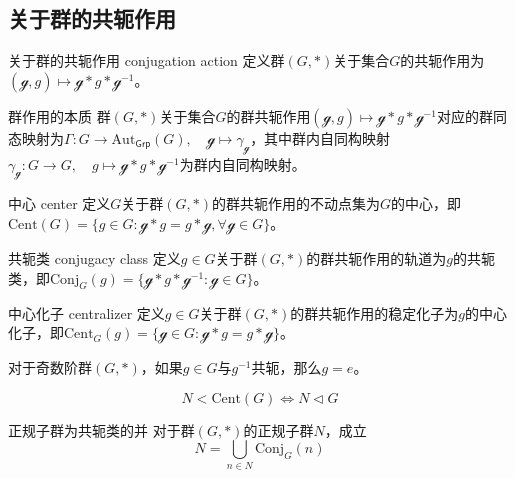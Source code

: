 \subsection{关于群的共轭作用}

\begin{definition}{关于群的共轭作用 conjugation action}
	定义群$(G,*)$关于集合$G$的共轭作用为$(\mathcal{g},g)\mapsto \mathcal{g}*g*\mathcal{g}^{-1}$。
\end{definition}

\begin{theorem}{群作用的本质}
	群$(G,*)$关于集合$G$的群共轭作用$(\mathcal{g},g)\mapsto \mathcal{g}*g*\mathcal{g}^{-1}$对应的群同态映射为$\Gamma:G\to \mathrm{Aut}_{\mathsf{Grp}}(G),\quad \mathcal{g}\mapsto \gamma_{\mathcal{g}}$，其中群内自同构映射$\gamma_{\mathcal{g}}:G\to G,\quad g\mapsto \mathcal{g}* g *\mathcal{g}^{-1}$为群内自同构映射。
\end{theorem}

\begin{definition}{中心 center}
	定义$G$关于群$(G,*)$的群共轭作用的不动点集为$G$的中心，即$\mathrm{Cent}(G)=\{ g\in G:\mathcal{g}*g=g*\mathcal{g},\forall \mathcal{g}\in G \}$。
\end{definition}

\begin{definition}{共轭类 conjugacy class}
	定义$g\in G$关于群$(G,*)$的群共轭作用的轨道为$g$的共轭类，即$\mathrm{Conj}_G(g)=\{ \mathcal{g}*g*\mathcal{g}^{-1}:\mathcal{g}\in G \}$。
\end{definition}

\begin{definition}{中心化子 centralizer}
	定义$g\in G$关于群$(G,*)$的群共轭作用的稳定化子为$g$的中心化子，即$\mathrm{Cent}_G(g)=\{ \mathcal{g}\in G:\mathcal{g}*g=g*\mathcal{g} \}$。
\end{definition}

\begin{proposition}
	对于奇数阶群$(G,*)$，如果$g\in G$与$g^{-1}$共轭，那么$g=e$。
\end{proposition}

\begin{proposition}
	$$
	N<\mathrm{Cent}(G)\iff N\lhd G
	$$
\end{proposition}

\begin{proposition}{}{正规子群为共轭类的并}
	对于群$(G,*)$的正规子群$N$，成立
	$$
	N=\bigcup_{n\in N}\mathrm{Conj}_G(n)
	$$
\end{proposition}

